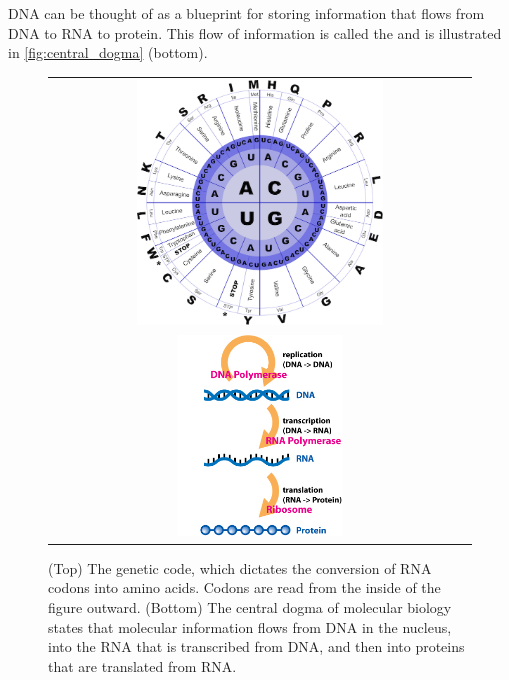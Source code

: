 DNA can be thought of as a blueprint for storing information that flows from DNA to RNA to protein. This flow of information is called the  and is illustrated in \autoref{fig:central_dogma} (bottom).\\

\begin{figure}[hp]
\centering
\mySfFamily
\begin{tabular}{c}
\includegraphics[width = 0.6\textwidth]{../images/genetic_code.png}\\[3ex]
\includegraphics[width = 0.4\textwidth]{../images/Central_Dogma_of_Molecular_Biochemistry_with_Enzymes.jpg}
\end{tabular}
\caption{(Top) The genetic code, which dictates the conversion of RNA codons into amino acids. Codons are read from the inside of the figure outward. (Bottom) The central dogma of molecular biology states that molecular information flows from DNA in the nucleus, into the RNA that is transcribed from DNA, and then into proteins that are translated from RNA.}
\label{fig:central_dogma}
\end{figure}

